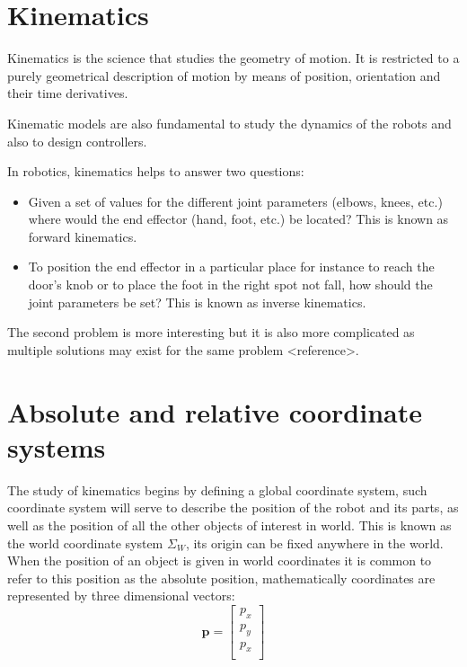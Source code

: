 \documentclass[a4paper]{report}
\begin{document}
\section{Kinematics}
Kinematics is the science that studies the geometry of motion. It is restricted
to a purely geometrical description of motion by means of position, orientation
and their time derivatives.

Kinematic models are also fundamental to study the dynamics of the robots and
also to design controllers.

In robotics, kinematics helps to answer two questions:
\begin{itemize}
    \item{} Given a set of values for the different joint parameters (elbows,
        knees, etc.) where would the end effector (hand, foot, etc.) be located?
        This is known as forward kinematics.
    \item{} To position the end effector in a particular place for instance to
        reach the door's knob or to place the foot in the right spot not fall, how
        should the joint parameters be set? This is known as inverse kinematics.
\end{itemize}

The second problem is more interesting but it is also more complicated as multiple
solutions may exist for the same problem <reference>.


\section{Absolute and relative coordinate systems}
The study of kinematics begins by defining a global coordinate system, such
coordinate system will serve to describe the position of the robot and its
parts, as well as the position of all the other objects of interest in world.
This is known as the world coordinate system $\Sigma_W$, its origin can be
fixed anywhere in the world. When the position of an object is given in
world coordinates it is common to refer to this position as the absolute
position, mathematically coordinates are represented by three dimensional vectors:
\begin{equation}
    \boldsymbol{p} = \begin{bmatrix}
        p_x\\
        p_y\\
        p_x\\
    \end{bmatrix}
\end{equation}
\end{document}
